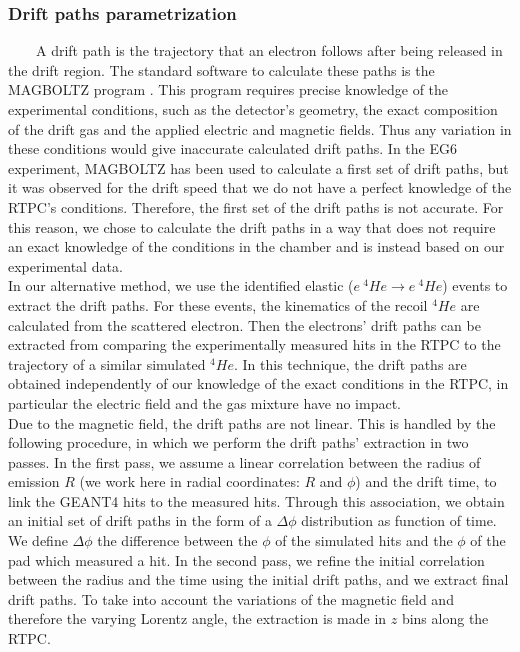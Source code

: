 \subsubsection{Drift paths parametrization}
~~~~A drift path is the trajectory that an electron follows after being 
released in the drift region. The standard software to calculate these paths is 
the MAGBOLTZ program \cite{MAGBOLTZ}. This program requires precise knowledge 
of the experimental conditions, such as the detector's geometry, the exact 
composition of the drift gas and the applied electric and magnetic fields. Thus 
any variation in these conditions would give inaccurate calculated drift paths.  
In the EG6 experiment, MAGBOLTZ has been used to calculate a first set of drift 
paths, but it was observed for the drift speed that we do not have a perfect 
knowledge of the RTPC's conditions. Therefore, the first set of the drift paths 
is not accurate. For this reason, we chose to calculate the drift paths in a 
way that does not require an exact knowledge of the conditions in the chamber 
and is instead based on our experimental data.  \\

In our alternative method, we use the identified elastic ($e ~ ^{4}He \rightarrow e ~ ^{4}He$) events to extract the drift paths. For these events, the kinematics of the recoil $^{4}He$ are calculated from the scattered electron. Then the electrons' drift paths can be extracted from comparing the experimentally measured hits in the RTPC to the trajectory of a similar simulated $^{4}He$. In this technique, the drift paths are obtained independently of our knowledge of the exact conditions in the RTPC, in particular the electric field and the gas mixture have no impact. \\

Due to the magnetic field, the drift paths are not linear. This is handled by 
the following procedure, in which we perform the drift paths' extraction in 
two passes. In the first pass, we assume a linear correlation between the 
radius of emission $R$ (we work here in radial coordinates: $R$ and $\phi$) and the 
drift time, to link the GEANT4 hits to the measured hits. Through this association, we obtain an 
initial set of drift paths in the form of a $\Delta \phi$ distribution as function of time. We define $\Delta \phi$ the 
difference between the $\phi$ of the simulated hits and the $\phi$ of the pad 
which measured a hit. In the second pass, we refine the initial 
correlation between the radius and the time using the initial drift paths, and 
we extract final drift paths. To take into account the variations of the magnetic 
field and therefore the varying Lorentz angle, the extraction 
is made in $z$ bins along the RTPC. \\


